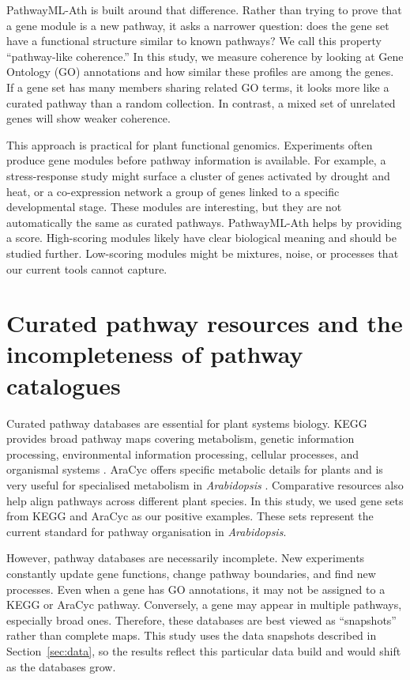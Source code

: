 \documentclass[12pt,letterpaper,oneside,openany]{book}
\begin{document}
PathwayML-Ath is built around that difference. Rather than trying to prove that a gene module is a new pathway, it asks a narrower question: does the gene set have a functional structure similar to known pathways? We call this property ``pathway-like coherence.'' In this study, we measure coherence by looking at Gene Ontology (GO) annotations and how similar these profiles are among the genes. If a gene set has many members sharing related GO terms, it looks more like a curated pathway than a random collection. In contrast, a mixed set of unrelated genes will show weaker coherence.

This approach is practical for plant functional genomics. Experiments often produce gene modules before pathway information is available. For example, a stress-response study might surface a cluster of genes activated by drought and heat, or a co-expression network a group of genes linked to a specific developmental stage. These modules are interesting, but they are not automatically the same as curated pathways. PathwayML-Ath helps by providing a score. High-scoring modules likely have clear biological meaning and should be studied further. Low-scoring modules might be mixtures, noise, or processes that our current tools cannot capture.

\section{Curated pathway resources and the incompleteness of pathway catalogues}
\label{sec:bg_pathway_databases}

Curated pathway databases are essential for plant systems biology. KEGG provides broad pathway maps covering metabolism, genetic information processing, environmental information processing, cellular processes, and organismal systems \citep{kanehisa2023kegg}. AraCyc offers specific metabolic details for plants and is very useful for specialised metabolism in \textit{Arabidopsis} \citep{hawkins2021plant}. Comparative resources also help align pathways across different plant species. In this study, we used gene sets from KEGG and AraCyc as our positive examples. These sets represent the current standard for pathway organisation in \textit{Arabidopsis}.

However, pathway databases are necessarily incomplete. New experiments constantly update gene functions, change pathway boundaries, and find new processes. Even when a gene has GO annotations, it may not be assigned to a KEGG or AraCyc pathway. Conversely, a gene may appear in multiple pathways, especially broad ones. Therefore, these databases are best viewed as ``snapshots'' rather than complete maps. This study uses the data snapshots described in Section~\ref{sec:data}, so the results reflect this particular data build and would shift as the databases grow.
\end{document}
